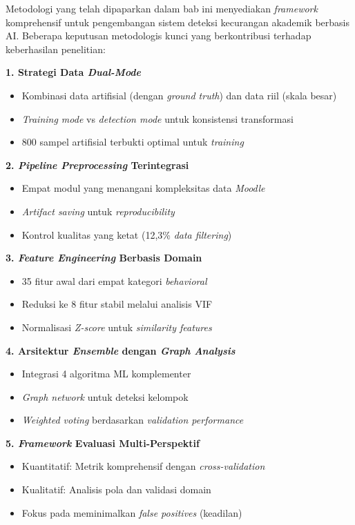 Metodologi yang telah dipaparkan dalam bab ini menyediakan \textit{framework} komprehensif untuk pengembangan sistem deteksi kecurangan akademik berbasis AI. Beberapa keputusan metodologis kunci yang berkontribusi terhadap keberhasilan penelitian:

\textbf{1. Strategi Data \textit{Dual-Mode}}
\begin{itemize}
    \item Kombinasi data artifisial (dengan \textit{ground truth}) dan data riil (skala besar)
    \item \textit{Training mode} vs \textit{detection mode} untuk konsistensi transformasi
    \item 800 sampel artifisial terbukti optimal untuk \textit{training}
\end{itemize}

\textbf{2. \textit{Pipeline Preprocessing} Terintegrasi}
\begin{itemize}
    \item Empat modul yang menangani kompleksitas data \textit{Moodle}
    \item \textit{Artifact saving} untuk \textit{reproducibility}
    \item Kontrol kualitas yang ketat (12,3\% \textit{data filtering})
\end{itemize}

\textbf{3. \textit{Feature Engineering} Berbasis Domain}
\begin{itemize}
    \item 35 fitur awal dari empat kategori \textit{behavioral}
    \item Reduksi ke 8 fitur stabil melalui analisis VIF
    \item Normalisasi \textit{Z-score} untuk \textit{similarity features}
\end{itemize}

\textbf{4. Arsitektur \textit{Ensemble} dengan \textit{Graph Analysis}}
\begin{itemize}
    \item Integrasi 4 algoritma ML komplementer
    \item \textit{Graph network} untuk deteksi kelompok
    \item \textit{Weighted voting} berdasarkan \textit{validation performance}
\end{itemize}

\textbf{5. \textit{Framework} Evaluasi Multi-Perspektif}
\begin{itemize}
    \item Kuantitatif: Metrik komprehensif dengan \textit{cross-validation}
    \item Kualitatif: Analisis pola dan validasi domain
    \item Fokus pada meminimalkan \textit{false positives} (keadilan)
\end{itemize}


